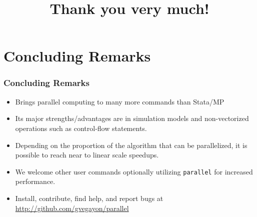 \documentclass[9pt,\ExtraDocOpts]{beamer}
\begin{document}
\section{Concluding Remarks}

\begin{frame}
\frametitle{Concluding Remarks}

\begin{itemize}
\item Brings parallel computing to many more commands than Stata/MP \pause{}
\item Its major strengths/advantages are in simulation models and non-vectorized operations such as control-flow statements.\pause{}
\item Depending on the proportion of the algorithm that can be parallelized, it is possible to reach near to linear scale speedups.\pause{}
\item We welcome other user commands optionally utilizing {\tt parallel} for increased performance. \pause{}
\item Install, contribute, find help, and report bugs at \url{http://github.com/gvegayon/parallel}

\end{itemize}

\end{frame}

\title{Thank you very much!}

\frame{\maketitle
}
\end{document}

